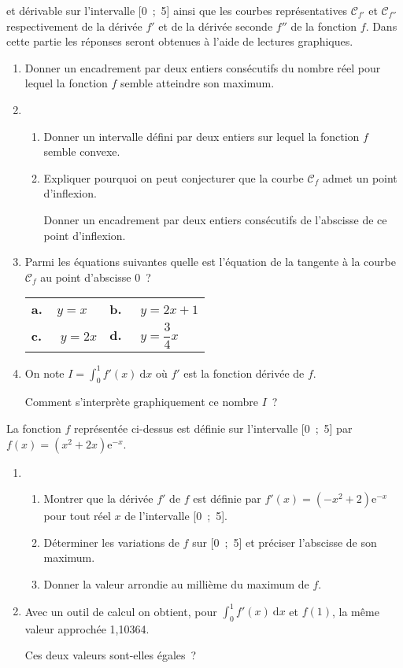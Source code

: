 et dérivable sur l'intervalle [0~;~5] ainsi que les courbes représentatives $\mathscr{C}_{f'}$ et $\mathscr{C}_{f''}$ respectivement
de la dérivée $f'$ et de la dérivée seconde $f''$ de la fonction $f$.
\medbreak
{}
\medbreak
Dans cette partie les réponses seront obtenues à l'aide de lectures graphiques.
\medbreak
\begin{enumerate}
     \item Donner un encadrement par deux entiers consécutifs du nombre réel pour lequel la
     fonction $f$ semble atteindre son maximum.
     \item
     \begin{enumerate}[label=\alph*.]
          \item Donner un intervalle défini par deux entiers sur lequel la fonction $f$ semble convexe.
          \item Expliquer pourquoi on peut conjecturer que la courbe $\mathscr{C}_f$ admet un point d'inflexion.
          \par
          Donner un encadrement par deux entiers consécutifs de l'abscisse de ce point d'inflexion.
     \end{enumerate}
     \item Parmi les équations suivantes quelle est l'équation de la tangente à la courbe $\mathscr{C}_f$ au point d'abscisse $0$~?
     \begin{center}
          \begin{tabularx}{\linewidth}{XX}%
               \textbf{a.~~}$y=x$&\textbf{b.~~} $y = 2x+ 1$\\
               \textbf{c.~~} $y= 2x$&\textbf{d.~~} $y= \dfrac{3}{4}x$\\
          \end{tabularx}
     \end{center}
     \item On note $I = \displaystyle\int_0^1 f'(x)\:\text{d}x$ où $f'$ est la fonction dérivée de $f$.
     \par
     Comment s'interprète graphiquement ce nombre $I$~?
\end{enumerate}
\bigbreak
{}
\medbreak
La fonction $f$ représentée ci-dessus est définie sur l'intervalle [0~;~5] par $f(x) = \left(x^2 + 2x\right)\text{e}^{-x}$.
\medbreak
\begin{enumerate}
     \item
     \begin{enumerate}[label=\alph*.]
          \item Montrer que la dérivée $f'$ de $f$ est définie par $f'(x) = \left(- x^2 + 2\right)\text{e}^{-x}$ pour tout réel $x$ de l'intervalle [0~;~5].
          \item Déterminer les variations de $f$ sur [0~;~5] et préciser l'abscisse de son maximum.
          \item Donner la valeur arrondie au millième du maximum de $f$.
     \end{enumerate}
     \item Avec un outil de calcul on obtient, pour $\displaystyle\int_0^1 f'(x)\:\text{d}x$ et $f(1)$, la même valeur approchée 1,10364.
     \par
     Ces deux valeurs sont-elles égales~?
\end{enumerate}
